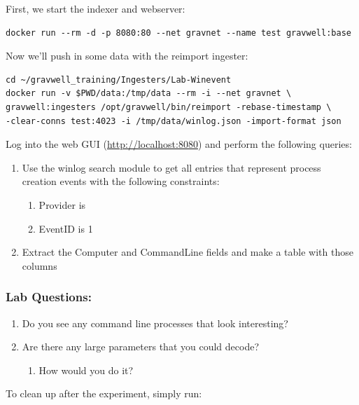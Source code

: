First, we start the indexer and webserver:

\begin{Verbatim}[breaklines=true]
docker run --rm -d -p 8080:80 --net gravnet --name test gravwell:base
\end{Verbatim}

Now we'll push in some data with the reimport ingester:

\begin{Verbatim}[breaklines=true]
cd ~/gravwell_training/Ingesters/Lab-Winevent
docker run -v $PWD/data:/tmp/data --rm -i --net gravnet \
gravwell:ingesters /opt/gravwell/bin/reimport -rebase-timestamp \
-clear-conns test:4023 -i /tmp/data/winlog.json -import-format json
\end{Verbatim}

Log into the web GUI (\href{http://localhost:8080}{http://localhost:8080}) and perform the following queries:

\begin{enumerate}
\item Use the winlog search module to get all entries that represent process creation events with the following constraints:
	\begin{enumerate}
	\item Provider is \code{Microsoft-Windows-Sysmon}
	\item EventID is 1
	\end{enumerate}
\item Extract the Computer and CommandLine fields and make a table with those columns
\end{enumerate}

\subsubsection{Lab Questions:}

\begin{enumerate}
\item Do you see any command line processes that look interesting?
\item Are there any large parameters that you could decode?
	\begin{enumerate}
	\item How would you do it?
	\end{enumerate}
\end{enumerate}

To clean up after the experiment, simply run:



